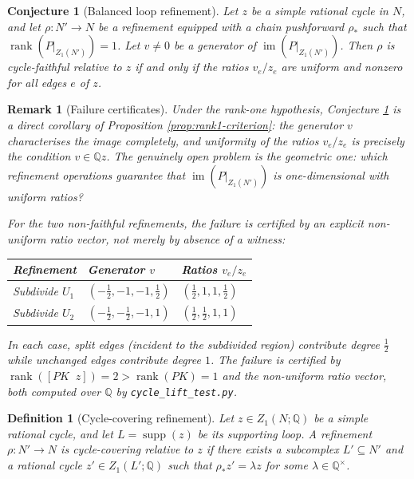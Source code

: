 \documentclass[11pt]{article}
\newtheorem{definition}[theorem]{Definition}
\newtheorem{remark}[theorem]{Remark}
\newtheorem{conjecture}[theorem]{Conjecture}
\newcommand{\Q}{\mathbb{Q}}
\begin{document}
\begin{conjecture}[Balanced loop refinement]\label{conj:balanced-loop}
Let \(z\) be a simple rational cycle in \(N\), and let
\(\rho:N'\to N\) be a refinement equipped with a chain pushforward \(\rho_*\)
such that \(\operatorname{rank}(P|_{Z_1(N')})=1\). Let \(v\neq 0\) be a
generator of \(\operatorname{im}(P|_{Z_1(N')})\). Then \(\rho\) is
cycle-faithful relative to \(z\) if and only if the ratios \(v_e/z_e\)
are uniform and nonzero for all edges \(e\) of \(z\).
\end{conjecture}

\begin{remark}[Failure certificates]
Under the rank-one hypothesis, Conjecture \ref{conj:balanced-loop} is a
direct corollary of Proposition \ref{prop:rank1-criterion}: the generator
\(v\) characterises the image completely, and uniformity of the ratios
\(v_e/z_e\) is precisely the condition \(v\in\Q z\). The genuinely open
problem is the geometric one: which refinement operations guarantee that
\(\operatorname{im}(P|_{Z_1(N')})\) is one-dimensional with uniform ratios?

For the two non-faithful refinements, the failure is certified by an explicit
non-uniform ratio vector, not merely by absence of a witness:

\begin{center}
\small
\begin{tabular}{lll}
\toprule
Refinement & Generator \(v\) & Ratios \(v_e/z_e\) \\
\midrule
Subdivide \(U_1\) & \((-\tfrac{1}{2},-1,-1,\tfrac{1}{2})\) &
\((\tfrac{1}{2},1,1,\tfrac{1}{2})\) \\
Subdivide \(U_2\) & \((-\tfrac{1}{2},-\tfrac{1}{2},-1,1)\) &
\((\tfrac{1}{2},\tfrac{1}{2},1,1)\) \\
\bottomrule
\end{tabular}
\end{center}

In each case, split edges (incident to the subdivided region) contribute
degree \(\tfrac{1}{2}\) while unchanged edges contribute degree \(1\).
The failure is certified by \(\operatorname{rank}([PK\;\;z])=2>\operatorname{rank}(PK)=1\)
and the non-uniform ratio vector, both computed over \(\Q\) by
\texttt{cycle\_lift\_test.py}.
\end{remark}

\begin{definition}[Cycle-covering refinement]\label{def:cycle-covering}
Let \(z\in Z_1(N;\Q)\) be a simple rational cycle, and let
\(L=\operatorname{supp}(z)\) be its supporting loop. A refinement
\(\rho:N'\to N\) is \emph{cycle-covering relative to \(z\)} if there
exists a subcomplex \(L'\subseteq N'\) and a rational cycle
\(z'\in Z_1(L';\Q)\) such that \(\rho_*z'=\lambda z\) for some
\(\lambda\in\Q^\times\).
\end{definition}
\end{document}
